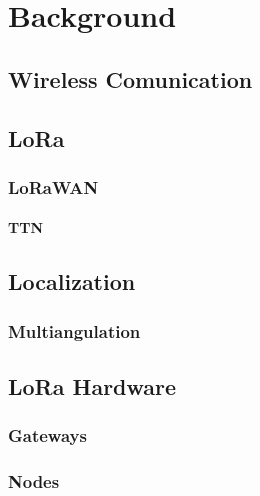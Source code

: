 \chapter{Background}

\section{Wireless Comunication}
\section{\ac{LoRa}}

\subsection{\ac{LoRaWAN}}

\subsubsection{\ac{TTN}}

\section{Localization}

\subsection{Multiangulation}

\section{\ac{LoRa} Hardware}

\subsection{Gateways}

\subsection{Nodes}